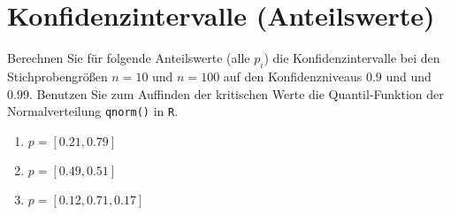 % 
% 
% 
% 
% 

\section{Konfidenzintervalle (Anteilswerte)}

Berechnen Sie für folgende Anteilswerte (alle $p_i$) die Konfidenzintervalle bei den Stichprobengrößen $n=10$ und $n=100$ auf den Konfidenzniveaus $0.9$ und und $0.99$.
Benutzen Sie zum Auffinden der kritischen Werte die Quantil-Funktion der Normalverteilung \texttt{qnorm()} in \texttt{R}.

\begin{enumerate}
  \item $p=[0.21, 0.79]$ 
  \item $p=[0.49, 0.51]$
  \item $p=[0.12, 0.71, 0.17]$
\end{enumerate}


